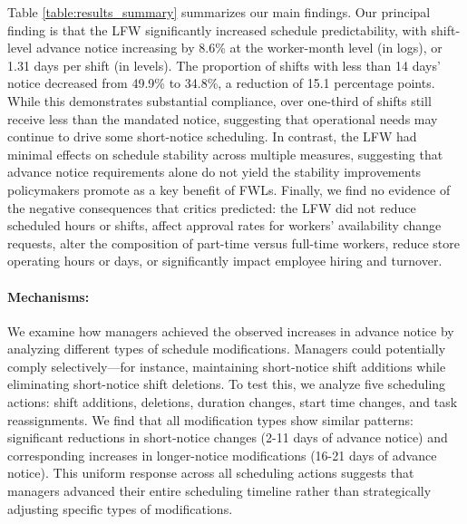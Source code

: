 \documentclass[letterpaper,11pt,leqno]{article}
\theoremstyle{paper}
\begin{document}
Table \ref{table:results_summary} summarizes our main findings. Our principal finding is that the LFW significantly increased schedule predictability, with shift-level advance notice increasing by 8.6\% at the worker-month level (in logs), or 1.31 days per shift (in levels). The proportion of shifts with less than 14 days' notice decreased from 49.9\% to 34.8\%, a reduction of 15.1 percentage points. While this demonstrates substantial compliance, over one-third of shifts still receive less than the mandated notice, suggesting that operational needs may continue to drive some short-notice scheduling. In contrast, the LFW had minimal effects on schedule stability across multiple measures, suggesting that advance notice requirements alone do not yield the stability improvements policymakers promote as a key benefit of FWLs. Finally, we find no evidence of the negative consequences that critics predicted: the LFW did not reduce scheduled hours or shifts, affect approval rates for workers' availability change requests, alter the composition of part-time versus full-time workers, reduce store operating hours or days, or significantly impact employee hiring and turnover. 


\paragraph{Mechanisms:}
We examine how managers achieved the observed increases in advance notice by analyzing different types of schedule modifications. Managers could potentially comply selectively—for instance, maintaining short-notice shift additions while eliminating short-notice shift deletions. To test this, we analyze five scheduling actions: shift additions, deletions, duration changes, start time changes, and task reassignments. We find that all modification types show similar patterns: significant reductions in short-notice changes (2-11 days of advance notice) and corresponding increases in longer-notice modifications (16-21 days of advance notice). This uniform response across all scheduling actions suggests that managers advanced their entire scheduling timeline rather than strategically adjusting specific types of modifications.
\end{document}
